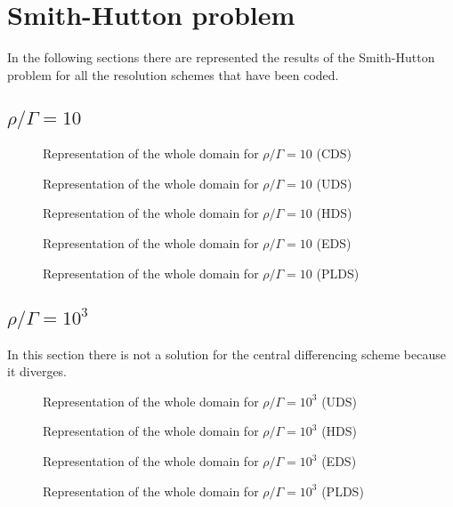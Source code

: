 \chapter{Smith-Hutton problem}
In the following sections there are represented the results of the Smith-Hutton problem for all the resolution schemes that have been coded.
\section{$\rho/\Gamma=10$}
\begin{figure}[H]
	\centering
	
	\caption{Representation of the whole domain for $\rho/\Gamma=10$ (CDS)}
\end{figure}
\begin{figure}[H]
	\centering
	
	\caption{Representation of the whole domain for $\rho/\Gamma=10$ (UDS)}
\end{figure}
\begin{figure}[H]
	\centering
	
	\caption{Representation of the whole domain for $\rho/\Gamma=10$ (HDS)}
\end{figure}
\begin{figure}[H]
	\centering
	
	\caption{Representation of the whole domain for $\rho/\Gamma=10$ (EDS)}
\end{figure}
\begin{figure}[H]
	\centering
	
	\caption{Representation of the whole domain for $\rho/\Gamma=10$ (PLDS)}
\end{figure}

\section{$\rho/\Gamma=10^{3}$}
In this section there is not a solution for the central differencing scheme because it diverges.
\begin{figure}[H]
	\centering
	
	\caption{Representation of the whole domain for $\rho/\Gamma=10^{3}$ (UDS)}
\end{figure}
\begin{figure}[H]
	\centering
	
	\caption{Representation of the whole domain for $\rho/\Gamma=10^{3}$ (HDS)}
\end{figure}
\begin{figure}[H]
	\centering
	
	\caption{Representation of the whole domain for $\rho/\Gamma=10^{3}$ (EDS)}
\end{figure}
\begin{figure}[H]
	\centering
	
	\caption{Representation of the whole domain for $\rho/\Gamma=10^{3}$ (PLDS)}
\end{figure}

